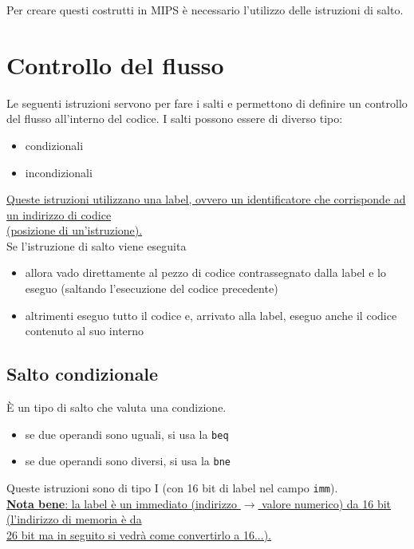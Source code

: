 \documentclass[../main.tex]{subfiles}
\begin{document}
\noindent
Per creare questi costrutti in MIPS è necessario l'utilizzo
delle istruzioni di salto.

\section{Controllo del flusso}
Le seguenti istruzioni servono per fare i salti e permettono
di definire un controllo del flusso all'interno del codice.
I salti possono essere di diverso tipo:
\begin{itemize}
    \item condizionali
    \item incondizionali
\end{itemize}

\vspace{2mm}

\noindent
\underline{Queste istruzioni utilizzano una label, ovvero un identificatore
che corrisponde ad un indirizzo di codice} \\
\underline{(posizione di un'istruzione).}
\\[2mm]
Se l'istruzione di salto viene eseguita
\begin{itemize}
    \item allora vado direttamente al pezzo di codice contrassegnato
    dalla label e lo eseguo (saltando l'esecuzione del codice precedente)
    \item altrimenti eseguo tutto il codice e, arrivato alla label,
    eseguo anche il codice contenuto al suo interno
\end{itemize}

\subsection{Salto condizionale}
È un tipo di salto che valuta una condizione.
\begin{itemize}
    \item se due operandi sono uguali, si usa la \texttt{beq}
    \item se due operandi sono diversi, si usa la \texttt{bne}
\end{itemize}

\vspace{2mm}

\noindent
Queste istruzioni sono di tipo I (con 16 bit di label nel campo
\texttt{imm}).
\\[2mm]
\underline{\textbf{Nota bene}: la label è un immediato (indirizzo
$\rightarrow$ valore numerico) da 16 bit (l'indirizzo di memoria è da} \\
\underline{26 bit ma in seguito si vedrà come convertirlo a 16...).}
\end{document}
